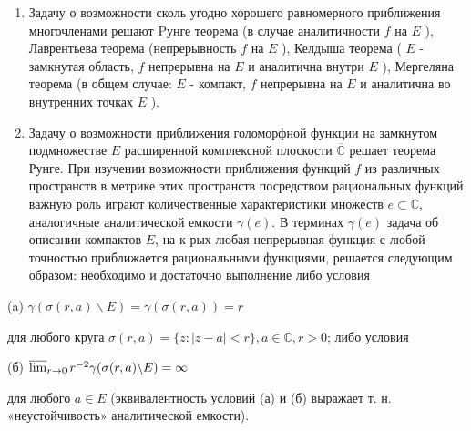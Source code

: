 \documentclass[10pt]{article}
\begin{document}
\begin{enumerate}

  \item Задачу о возможности сколь угодно хорошего равномерного приближения многочленами решают Pунге теорема (в случае аналитичности $f$ на $E$ ), Лаврентьева теорема (непрерывность $f$ на $E$ ), Келдыша теорема ( $E$ - замкнутая область, $f$ непрерывна на $E$ и аналитична внутри $E$ ), Мергеляна теорема (в общем случае: $E$ - компакт, $f$ непрерывна на $E$ и аналитична во внутренних точках $E$ ).



  \item Задачу о возможности приближения голоморфной функции на замкнутом подмножестве $E$ расширенной комплексной плоскости $\overline{\mathbb{C}}$ решает теорема Рунге. При изучении возможности приближения функций $f$ из различных пространств в метрике этих пространств посредством рациональных функций важную роль играют количественные характеристики множеств $e \subset \mathbb{C}$, аналогичные аналитической емкости $\gamma(e)$. В терминах $\gamma(e)$ задача об описании компактов $E$, на к-рых любая непрерывная функция с любой точностью приближается рациональными функциями, решается следующим образом: необходимо и достаточно выполнение либо условия



\end{enumerate}



(a) $\gamma(\sigma(r, a) \backslash E)=\gamma(\sigma(r, a))=r$



для любого круга $\sigma(r, a)=\{z:|z-a|<r\}, a \in \mathbb{C}, r>0$; либо условия



(б) $\varlimsup_{r \rightarrow 0} r^{-2} \gamma(\sigma(r, a) \backslash E)=\infty$



для любого $a \in E$ (эквивалентность условий (а) и (б) выражает т. н. «неустойчивость» аналитической емкости).
\end{document}
